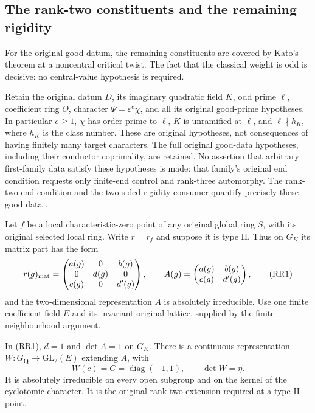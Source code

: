 \subsection{The rank-two constituents and the remaining rigidity}
\label{sec:support-type-two-rigidity}

For the original good datum, the remaining constituents are covered by
Kato's theorem at a noncentral critical twist.  The fact that the
classical weight is odd is decisive: no central-value hypothesis is
required.

Retain the original datum $D$, its imaginary quadratic field $K$, odd
prime $\ell$, coefficient ring $O$, character
$\Psi=\varepsilon^e\chi$, and all its original good-prime hypotheses.
In particular $e\ge1$, $\chi$ has order prime to $\ell$,
$K$ is unramified at $\ell$, and $\ell\nmid h_K$, where $h_K$
is the class number.  These are original hypotheses, not consequences
of having finitely many target characters.  The full original
good-data hypotheses, including their conductor coprimality, are retained.
No assertion that arbitrary first-family data satisfy these hypotheses
is made: that family's original end condition requests only finite-end
control and rank-three automorphy.  The rank-two end condition and the
two-sided rigidity consumer quantify precisely these good data
\cite{support-type-two-source}.

Let $f$ be a local characteristic-zero point of any original global
ring $S$, with its original selected local ring.  Write $r=r_f$ and
suppose it is type II.  Thus on $G_K$ its matrix part has the form
\[
 r(g)_{\rm mat}=
 \begin{pmatrix}a(g)&0&b(g)\\0&d(g)&0\\c(g)&0&d'(g)\end{pmatrix},
 \qquad
 A(g)=\begin{pmatrix}a(g)&b(g)\\c(g)&d'(g)\end{pmatrix},          \tag{RR1}
\]
and the two-dimensional representation $A$ is absolutely irreducible.
Use one finite coefficient field $E$ and its invariant original
lattice, supplied by the finite-neighbourhood argument.

\begin{lemma}
\label{lem:support-type-two-representation}
In (RR1), $d=1$ and $\det A=1$ on $G_K$.  There is a continuous
representation $W:G_{\mathbf Q}\to\mathrm{GL}_2(E)$ extending $A$,
with
\[
 W(c)=C=\operatorname{diag}(-1,1),\qquad \det W=\eta.            \tag{RR2}
\]
It is absolutely irreducible on every open subgroup and on the kernel
of the cyclotomic character.  It is the original rank-two extension
required at a type-II point.
\end{lemma}

